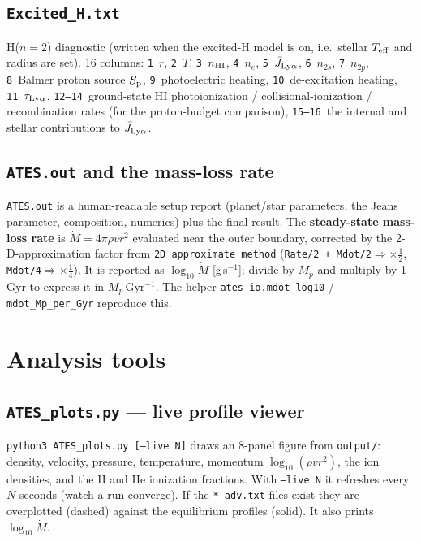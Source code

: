 \documentclass[english,a4paper]{kiseon_memo}
\begin{document}
\subsection{\texttt{Excited\_H.txt}}
H($n{=}2$) diagnostic (written when the excited-H model is on, i.e.\ stellar
$T_{\rm eff}$ and radius are set). 16 columns:
\texttt{1}~$r$, \texttt{2}~$T$, \texttt{3}~$n_{\rm HI}$, \texttt{4}~$n_e$,
\texttt{5}~$\bar J_{\rm Ly\alpha}$, \texttt{6}~$n_{2s}$, \texttt{7}~$n_{2p}$,
\texttt{8}~Balmer proton source $S_{\rm p}$, \texttt{9}~photoelectric heating,
\texttt{10}~de-excitation heating, \texttt{11}~$\tau_{\rm Ly\alpha}$,
\texttt{12--14}~ground-state HI photoionization / collisional-ionization /
recombination rates (for the proton-budget comparison), \texttt{15--16}~the
internal and stellar contributions to $\bar J_{\rm Ly\alpha}$.

\subsection{\texttt{ATES.out} and the mass-loss rate}
\texttt{ATES.out} is a human-readable setup report (planet/star parameters, the
Jeans parameter, composition, numerics) plus the final result. The
\textbf{steady-state mass-loss rate} is $\dot M = 4\pi\rho v r^2$ evaluated near
the outer boundary, corrected by the 2-D-approximation factor from
\texttt{2D approximate method} (\texttt{Rate/2 + Mdot/2}$\Rightarrow\times\frac12$,
\texttt{Mdot/4}$\Rightarrow\times\frac14$). It is reported as $\log_{10}\dot M$
[g\,s$^{-1}$]; divide by $M_p$ and multiply by 1\,Gyr to express it in
$M_p$\,Gyr$^{-1}$. The helper \texttt{ates\_io.mdot\_log10} / \texttt{mdot\_Mp\_per\_Gyr}
reproduce this.

\section{Analysis tools}

\subsection{\texttt{ATES\_plots.py} --- live profile viewer}
\texttt{python3 ATES\_plots.py [--live N]} draws an 8-panel figure from
\texttt{output/}: density, velocity, pressure, temperature, momentum
$\log_{10}(\rho v r^2)$, the ion densities, and the H and He ionization
fractions. With \texttt{--live N} it refreshes every $N$ seconds (watch a run
converge). If the \texttt{*\_adv.txt} files exist they are overplotted (dashed)
against the equilibrium profiles (solid). It also prints $\log_{10}\dot M$.
\end{document}
